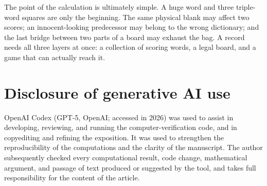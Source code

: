 \documentclass{article}
\theoremstyle{plain}
\begin{document}
The point of the calculation is ultimately simple. A huge word and three
triple-word squares are only the beginning. The same physical blank may affect
two scores; an innocent-looking predecessor may belong to the wrong dictionary;
and the last bridge between two parts of a board may exhaust the bag. A record
needs all three layers at once: a collection of scoring words, a legal board,
and a game that can actually reach it.

\section*{Disclosure of generative AI use}

OpenAI Codex (GPT-5, OpenAI; accessed in 2026) was used to assist in developing,
reviewing, and running the computer-verification code, and in copyediting and
refining the exposition. It was used to strengthen the reproducibility of the
computations and the clarity of the manuscript. The author subsequently checked
every computational result, code change, mathematical argument, and passage of
text produced or suggested by the tool, and takes full responsibility for the
content of the article.



\end{document}
